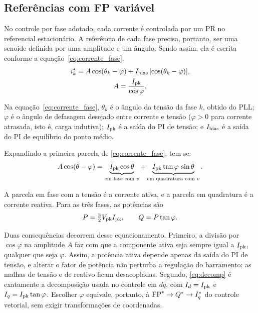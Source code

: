\subsection{Referências com FP variável}

No controle por fase adotado, cada corrente é controlada por um PR no
referencial estacionário. A referência de cada fase precisa, portanto, ser
uma senoide definida por uma amplitude e um ângulo. Sendo assim, ela é escrita conforme 
a equação~\eqref{eq:corrente_fase}.
\begin{equation}
    \begin{gathered}
        i_k^* = A\cos(\theta_k-\varphi) + I_{\mathrm{bias}}\,\lvert\cos(\theta_k-\varphi)\rvert,\\
        A = \frac{I_{\mathrm{pk}}}{\cos\varphi},
    \end{gathered}
    \label{eq:corrente_fase}
\end{equation}

Na equação~\eqref{eq:corrente_fase}, $\theta_k$ é o ângulo da tensão da fase $k$, obtido do PLL;
$\varphi$ é o ângulo de defasagem desejado entre corrente e tensão
($\varphi>0$ para corrente atrasada, isto é, carga indutiva);
$I_{\mathrm{pk}}$ é a saída do PI de tensão; e $I_{\mathrm{bias}}$ é a saída do PI de
equilíbrio do ponto médio.

Expandindo a primeira parcela de
\eqref{eq:corrente_fase}, tem-se:
\begin{equation}
    A\cos(\theta-\varphi) = \underbrace{I_{\mathrm{pk}}\cos\theta}_{\text{em fase com } v}
    + \underbrace{I_{\mathrm{pk}}\tan\varphi\,\sin\theta}_{\text{em quadratura com } v}.
    \label{eq:decomp}
\end{equation}

A parcela em fase com a tensão é a corrente ativa, e a parcela em quadratura
é a corrente reativa. Para as três fases, as potências são
\begin{equation}
    P = \tfrac{3}{2}V_{\mathrm{pk}}I_{\mathrm{pk}}, \qquad Q = P\tan\varphi .
    \label{eq:potencias}
\end{equation}

Duas consequências decorrem desse equacionamento. Primeiro, a divisão por $\cos\varphi$ na
amplitude $A$ faz com que a componente ativa seja sempre igual a $I_{\mathrm{pk}}$,
qualquer que seja $\varphi$. Assim, a potência ativa depende apenas da saída
do PI de tensão, e alterar o fator de potência não perturba a regulação do
barramento: as malhas de tensão e de reativo ficam desacopladas. Segundo,
\eqref{eq:decomp} é exatamente a decomposição usada no controle em $dq$, com
$I_d=I_{\mathrm{pk}}$ e $I_q=I_{\mathrm{pk}}\tan\varphi$. Escolher $\varphi$ equivale, portanto,
à $\mathrm{FP}^*\rightarrow Q^*\rightarrow I_q^*$ do controle vetorial, sem
exigir transformações de coordenadas.

